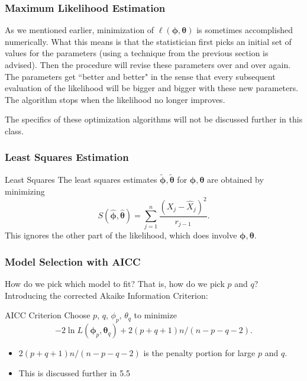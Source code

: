 \documentclass{beamer}
\begin{document}
\begin{frame}
\frametitle{Maximum Likelihood Estimation}

As we mentioned earlier, minimization of $\ell(\bm{\phi},\bm{\theta})$ is sometimes accomplished numerically. What this means is that the statistician first picks an initial set of values for the parameters (using a technique from the previous section is advised). Then the procedure will revise these parameters over and over again. The parameters get ``better and better" in the sense that every subsequent evaluation of the likelihood will be bigger and bigger with these new parameters. The algorithm stops when the likelihood no longer improves. 
\newline

The specifics of these optimization algorithms will not be discussed further in this class. 


\end{frame}

\begin{frame}
\frametitle{Least Squares Estimation}

\begin{block}{Least Squares}
The least squares estimates $\tilde{\bm{\phi}}, \tilde{\bm{\theta}}$ for $\bm{\phi},\bm{\theta}$ are obtained by minimizing 
\[
S(\hat{\bm{\phi}},\hat{\bm{\theta}}) = \sum_{j=1}^n\frac{ (X_j - \hat{X}_j)^2 }{r_{j-1} }.
\]
This ignores the other part of the likelihood, which does involve $\bm{\phi},\bm{\theta}$. 
\end{block}
\end{frame}


\begin{frame}
\frametitle{Model Selection with AICC}

How do we pick which model to fit? That is, how do we pick $p$ and $q$? Introducing the corrected Akaike Information Criterion:

\begin{block}{AICC Criterion}
Choose $p$, $q$, $\phi_p$, $\theta_q$ to minimize
\[
- 2 \ln L(\bm{\phi}_p,\bm{\theta}_q ) + 2 (p + q + 1)n/(n-p-q-2).
\]
\end{block}

\begin{itemize}
\item $2 (p + q + 1)n/(n-p-q-2)$ is the penalty portion for large $p$ and $q$.
\item This is discussed further in 5.5
\end{itemize}

\end{frame}
\end{document}
